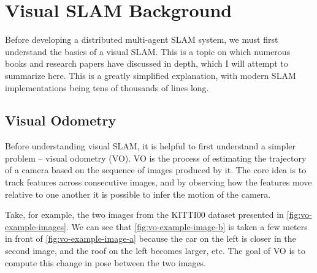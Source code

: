




\section{Visual SLAM Background}
\label{sec:visual-slam-background}
Before developing a distributed multi-agent SLAM system, we must first understand the basics of a visual SLAM. This is a topic on which numerous books \autocite{gao2021introduction} and research papers \autocite{durrant2006simultaneous} have discussed in depth, which I will attempt to summarize here. This is a greatly simplified explanation, with modern SLAM implementations being tens of thousands of lines long.

\subsection{Visual Odometry}
\label{sec:visual-slam-visual-odometry}
Before understanding visual SLAM, it is helpful to first understand a simpler problem – visual odometry (VO). VO is the process of estimating the trajectory of a camera based on the sequence of images produced by it. The core idea is to track features across consecutive images, and by observing how the features move relative to one another it is possible to infer the motion of the camera.

Take, for example, the two images from the KITTI00 dataset presented in \autoref{fig:vo-example-images}. We can see that \autoref{fig:vo-example-image-b} is taken a few meters in front of \autoref{fig:vo-example-image-a} because the car on the left is closer in the second image, and the roof on the left becomes larger, etc. The goal of VO is to compute this change in pose between the two images.

